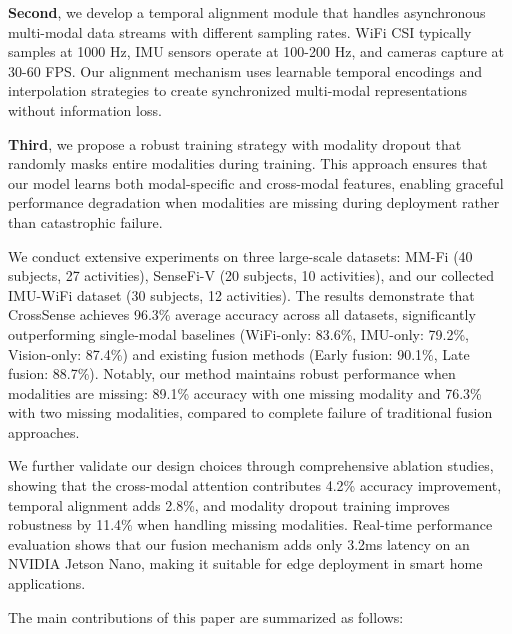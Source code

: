 \documentclass[10pt,twocolumn]{article}
\begin{document}
\textbf{Second}, we develop a temporal alignment module that handles asynchronous multi-modal data streams with different sampling rates. WiFi CSI typically samples at 1000 Hz, IMU sensors operate at 100-200 Hz, and cameras capture at 30-60 FPS. Our alignment mechanism uses learnable temporal encodings and interpolation strategies to create synchronized multi-modal representations without information loss.

\textbf{Third}, we propose a robust training strategy with modality dropout that randomly masks entire modalities during training. This approach ensures that our model learns both modal-specific and cross-modal features, enabling graceful performance degradation when modalities are missing during deployment rather than catastrophic failure.

We conduct extensive experiments on three large-scale datasets: MM-Fi (40 subjects, 27 activities), SenseFi-V (20 subjects, 10 activities), and our collected IMU-WiFi dataset (30 subjects, 12 activities). The results demonstrate that CrossSense achieves 96.3\% average accuracy across all datasets, significantly outperforming single-modal baselines (WiFi-only: 83.6\%, IMU-only: 79.2\%, Vision-only: 87.4\%) and existing fusion methods (Early fusion: 90.1\%, Late fusion: 88.7\%). Notably, our method maintains robust performance when modalities are missing: 89.1\% accuracy with one missing modality and 76.3\% with two missing modalities, compared to complete failure of traditional fusion approaches.

We further validate our design choices through comprehensive ablation studies, showing that the cross-modal attention contributes 4.2\% accuracy improvement, temporal alignment adds 2.8\%, and modality dropout training improves robustness by 11.4\% when handling missing modalities. Real-time performance evaluation shows that our fusion mechanism adds only 3.2ms latency on an NVIDIA Jetson Nano, making it suitable for edge deployment in smart home applications.

The main contributions of this paper are summarized as follows:
\end{document}

